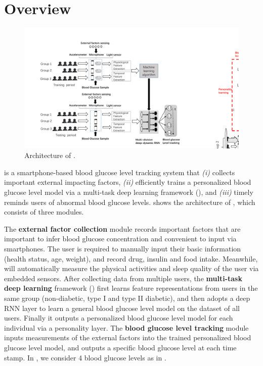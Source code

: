 
\section{Overview}
\label{sec:overview}

\begin{figure}[h]
  \centering
  \includegraphics[width=0.85\columnwidth]{./img/System_Arch1.pdf}
  \caption{Architecture of \sysname. }
  \label{fig:architecture}
\end{figure}

\sysname is a smartphone-based blood glucose level tracking system that \emph{(i)} collects important external impacting factors, \emph{(ii)} efficiently trains a personalized blood glucose level model via a multi-task deep learning framework (\modelname), and \emph{(iii)} timely reminds users of abnormal blood glucose levels.
 shows the architecture of \sysname, which consists of three modules.

The \textbf{external factor collection} module records important factors that are important to infer blood glucose concentration and convenient to input via smartphones.
The user is required to manually input their basic information (\eg health status, age, weight), and record drug, insulin and food intake.
Meanwhile, \sysname will automatically measure the physical activities and sleep quality of the user via embedded sensors.
After collecting data from multiple users, the \textbf{multi-task deep learning} framework (\modelname) first learns feature representations from users in the same group (non-diabetic, type I and type II diabetic), and then adopts a deep RNN layer to learn a general blood glucose level model on the dataset of all users.
Finally it outputs a personalized blood glucose level model for each individual via a personality layer.
The \textbf{blood glucose level tracking} module inputs measurements of the external factors into the trained personalized blood glucose level model, and outputs a specific blood glucose level at each time stamp.
In \sysname, we consider 4 blood glucose levels as in .

